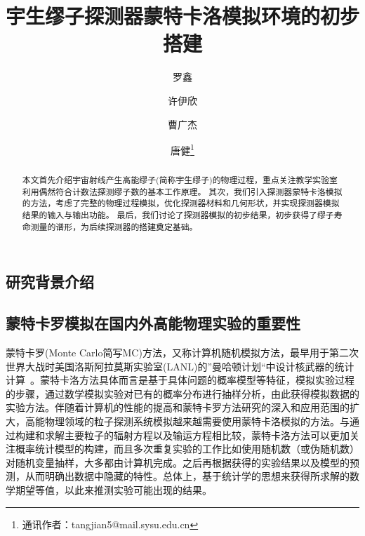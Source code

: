 \documentclass[aps,prd,superscriptaddress,nofootinbib,preprint]{ctexart}
\begin{document}
\setlength{\parindent}{2em}
\renewcommand{\headrulewidth}{0pt}

\begin{CJK}{UTF8}{gbsn}

\title{宇生缪子探测器蒙特卡洛模拟环境的初步搭建}

\author{罗鑫}
\author{许伊欣}
\author{曹广杰}
\author{唐健\footnote{通讯作者：tangjian5@mail.sysu.edu.cn}}



\begin{abstract}
 本文首先介绍宇宙射线产生高能缪子(简称宇生缪子)的物理过程，重点关注教学实验室利用偶然符合计数法探测缪子数的基本工作原理。
 其次，我们引入探测器蒙特卡洛模拟的方法，考虑了完整的物理过程模拟，优化探测器材料和几何形状，并实现探测器模拟结果的输入与输出功能。
 最后，我们讨论了探测器模拟的初步结果，初步获得了缪子寿命测量的谱形，为后续探测器的搭建奠定基础。
\end{abstract}

\maketitle

\section{研究背景介绍}
\subsection{蒙特卡罗模拟在国内外高能物理实验的重要性}

蒙特卡罗(Monte Carlo简写MC)方法，又称计算机随机模拟方法，最早用于第二次世界大战时美国洛斯阿拉莫斯实验室(LANL)的”曼哈顿计划“中设计核武器的统计计算~\cite{6}。蒙特卡洛方法具体而言是基于具体问题的概率模型等特征，模拟实验过程的步骤，通过数学模拟实验对已有的概率分布进行抽样分析，由此获得模拟数据的实验方法。伴随着计算机的性能的提高和蒙特卡罗方法研究的深入和应用范围的扩大，高能物理领域的粒子探测系统模拟越来越需要使用蒙特卡洛模拟的方法。与通过构建和求解主要粒子的辐射方程以及输运方程相比较，蒙特卡洛方法可以更加关注概率统计模型的构建，而且多次重复实验的工作比如使用随机数（或伪随机数）对随机变量抽样，大多都由计算机完成。之后再根据获得的实验结果以及模型的预测，从而明确出数据中隐藏的特性。总体上，基于统计学的思想来获得所求解的数学期望等值，以此来推测实验可能出现的结果。\\


\end{CJK}
\end{document}
